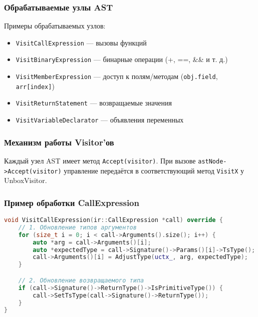 \subsubsection{Обрабатываемые узлы AST}
Примеры обрабатываемых узлов:
\begin{itemize}
    \item \texttt{VisitCallExpression} — вызовы функций
    \item \texttt{VisitBinaryExpression} — бинарные операции (+, ==, \&\& и т. д.)
    \item \texttt{VisitMemberExpression} — доступ к полям/методам (\texttt{obj.field}, \texttt{arr[index]})
    \item \texttt{VisitReturnStatement} — возвращаемые значения
    \item \texttt{VisitVariableDeclarator} — объявления переменных
\end{itemize}

\subsubsection{Механизм работы Visitor'ов}

Каждый узел AST имеет метод \texttt{Accept(visitor)}.
При вызове \texttt{astNode->Accept(visitor)} управление передаётся в соответствующий метод \texttt{VisitX} у UnboxVisitor.

\subsubsection{Пример обработки CallExpression}
\begin{lstlisting}[language=C++,caption=Обработка вызовов функций]
void VisitCallExpression(ir::CallExpression *call) override {
    // 1. Обновление типов аргументов
    for (size_t i = 0; i < call->Arguments().size(); i++) {
        auto *arg = call->Arguments()[i];
        auto *expectedType = call->Signature()->Params()[i]->TsType();
        call->Arguments()[i] = AdjustType(uctx_, arg, expectedType);
    }

    // 2. Обновление возвращаемого типа
    if (call->Signature()->ReturnType()->IsPrimitiveType()) {
        call->SetTsType(call->Signature()->ReturnType());
    }
}
\end{lstlisting}


